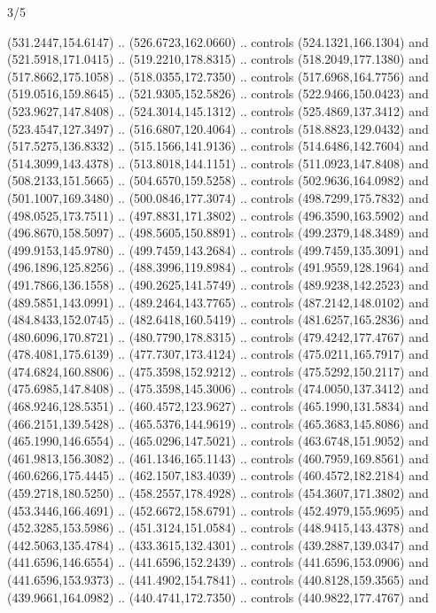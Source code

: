\begin{flagdescription}{3/5}
\begin{scope}[xshift=0.5\flaglength]
\begin{scope}[scale=0.00167\flagwidth,yshift=210.9mm,xshift=-175.8mm]
\begin{scope}[y=-1pt, x=1pt]
  (531.2447,154.6147) .. (526.6723,162.0660) .. controls (524.1321,166.1304) and
  (521.5918,171.0415) .. (519.2210,178.8315) .. controls (518.2049,177.1380) and
  (517.8662,175.1058) .. (518.0355,172.7350) .. controls (517.6968,164.7756) and
  (519.0516,159.8645) .. (521.9305,152.5826) .. controls (522.9466,150.0423) and
  (523.9627,147.8408) .. (524.3014,145.1312) .. controls (525.4869,137.3412) and
  (523.4547,127.3497) .. (516.6807,120.4064) .. controls (518.8823,129.0432) and
  (517.5275,136.8332) .. (515.1566,141.9136) .. controls (514.6486,142.7604) and
  (514.3099,143.4378) .. (513.8018,144.1151) .. controls (511.0923,147.8408) and
  (508.2133,151.5665) .. (504.6570,159.5258) .. controls (502.9636,164.0982) and
  (501.1007,169.3480) .. (500.0846,177.3074) .. controls (498.7299,175.7832) and
  (498.0525,173.7511) .. (497.8831,171.3802) .. controls (496.3590,163.5902) and
  (496.8670,158.5097) .. (498.5605,150.8891) .. controls (499.2379,148.3489) and
  (499.9153,145.9780) .. (499.7459,143.2684) .. controls (499.7459,135.3091) and
  (496.1896,125.8256) .. (488.3996,119.8984) .. controls (491.9559,128.1964) and
  (491.7866,136.1558) .. (490.2625,141.5749) .. controls (489.9238,142.2523) and
  (489.5851,143.0991) .. (489.2464,143.7765) .. controls (487.2142,148.0102) and
  (484.8433,152.0745) .. (482.6418,160.5419) .. controls (481.6257,165.2836) and
  (480.6096,170.8721) .. (480.7790,178.8315) .. controls (479.4242,177.4767) and
  (478.4081,175.6139) .. (477.7307,173.4124) .. controls (475.0211,165.7917) and
  (474.6824,160.8806) .. (475.3598,152.9212) .. controls (475.5292,150.2117) and
  (475.6985,147.8408) .. (475.3598,145.3006) .. controls (474.0050,137.3412) and
  (468.9246,128.5351) .. (460.4572,123.9627) .. controls (465.1990,131.5834) and
  (466.2151,139.5428) .. (465.5376,144.9619) .. controls (465.3683,145.8086) and
  (465.1990,146.6554) .. (465.0296,147.5021) .. controls (463.6748,151.9052) and
  (461.9813,156.3082) .. (461.1346,165.1143) .. controls (460.7959,169.8561) and
  (460.6266,175.4445) .. (462.1507,183.4039) .. controls (460.4572,182.2184) and
  (459.2718,180.5250) .. (458.2557,178.4928) .. controls (454.3607,171.3802) and
  (453.3446,166.4691) .. (452.6672,158.6791) .. controls (452.4979,155.9695) and
  (452.3285,153.5986) .. (451.3124,151.0584) .. controls (448.9415,143.4378) and
  (442.5063,135.4784) .. (433.3615,132.4301) .. controls (439.2887,139.0347) and
  (441.6596,146.6554) .. (441.6596,152.2439) .. controls (441.6596,153.0906) and
  (441.6596,153.9373) .. (441.4902,154.7841) .. controls (440.8128,159.3565) and
  (439.9661,164.0982) .. (440.4741,172.7350) .. controls (440.9822,177.4767) and

\end{scope}
\end{scope}
\end{scope}
\end{flagdescription}
